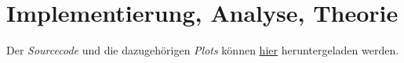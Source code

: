 \section{Implementierung, Analyse, Theorie}


Der \textit{Sourcecode} und die dazugehörigen \textit{Plots} können	
\href{https://mega.nz/file/Tp5BXTJT#VjmofQ7s2OlpbuZjRIcCgFyBOkAGJOaEPOxHiNdmeKU}
{hier}
heruntergeladen werden.
